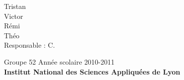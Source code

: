 \documentclass[12pt,twoside,a4paper,titlepage]{article}
\begin{document}
\begin{center}
\vspace*{1cm}
\LARGE \color{black} Tristan  \\
					 Victor  \\
					 Rémi  \\
					 Th\'eo  \\
\vspace*{1.5cm}
\Large Responsable : C. \\

\vspace*{1cm}

\Large Groupe 52 \hfill Ann\'ee scolaire 2010-2011\\
\vspace*{1cm}
\textbf{\Large Institut National des Sciences Appliqu\'{e}es de Lyon} \pagebreak
\end{center}


 


\end{document}
